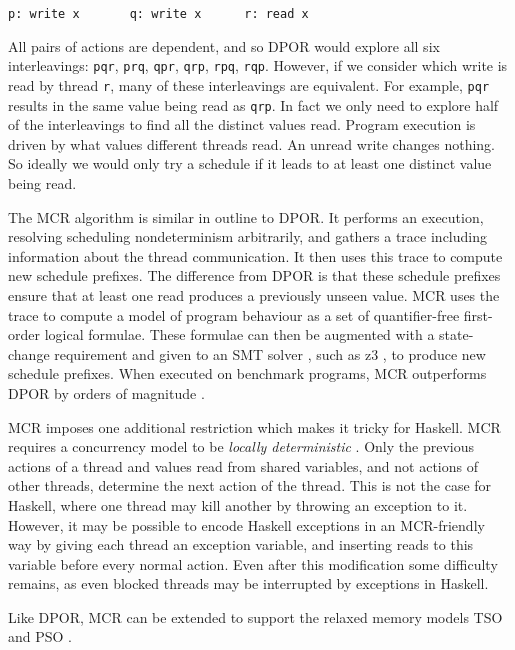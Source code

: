 \begin{center}
\verb|p: write x       q: write x      r: read x|
\end{center}

All pairs of actions are dependent, and so DPOR would explore all six
interleavings: \texttt{pqr}, \texttt{prq}, \texttt{qpr}, \texttt{qrp},
\texttt{rpq}, \texttt{rqp}.  However, if we consider which write is
read by thread \texttt{r}, many of these interleavings are equivalent.
For example, \texttt{pqr} results in the same value being read as
\texttt{qrp}.  In fact we only need to explore half of the
interleavings to find all the distinct values read.  Program execution
is driven by what values different threads read.  An unread write
changes nothing.  So ideally we would only try a schedule if it leads
to at least one distinct value being read.

The MCR algorithm is similar in outline to DPOR\@.  It performs an
execution, resolving scheduling nondeterminism arbitrarily, and
gathers a trace including information about the thread communication.
It then uses this trace to compute new schedule prefixes.  The
difference from DPOR is that these schedule prefixes ensure that at
least one read produces a previously unseen value.  MCR uses the trace
to compute a model of program behaviour as a set of quantifier-free
first-order logical formulae.  These formulae can then be augmented
with a state-change requirement and given to an SMT
solver \parencite{demoura2011}, such as z3 \parencite{demoura2008}, to produce new
schedule prefixes.  When executed on benchmark programs, MCR
outperforms DPOR by orders of magnitude \parencite{huang2017}.

MCR imposes one additional restriction which makes it tricky for
Haskell.  MCR requires a concurrency model to be \emph{locally
  deterministic} \parencite{huang2015}.  Only the previous actions of a
thread and values read from shared variables, and not actions of other
threads, determine the next action of the thread.  This is not the
case for Haskell, where one thread may kill another by throwing an
exception to it.  However, it may be possible to encode Haskell
exceptions in an MCR-friendly way by giving each thread an exception
variable, and inserting reads to this variable before every normal
action.  Even after this modification some difficulty remains, as even
blocked threads may be interrupted by exceptions in Haskell.

Like DPOR, MCR can be extended to support the relaxed memory models TSO and
PSO \parencite{huang2016}.

